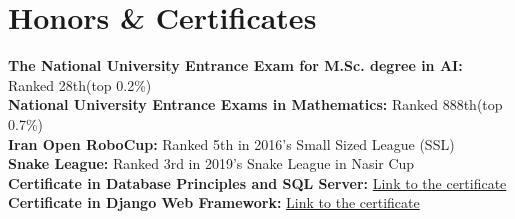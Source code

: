 
\section{Honors \& Certificates}
  \vspace{2pt}
  \resumeSubHeadingListStart
    \small{\item{
        \textbf{The National University Entrance Exam for M.Sc. degree in AI:} { Ranked 28th(top 0.2\%)}
        \\ \vspace{3pt}
        \textbf{National University Entrance Exams in Mathematics:} { Ranked 888th(top 0.7\%)}
        \\ \vspace{3pt}
        \textbf{Iran Open RoboCup:} { Ranked 5th in 2016's Small Sized League (SSL)}
        \\ \vspace{3pt}
        \textbf{Snake League:} { Ranked 3rd in 2019's Snake League in Nasir Cup}
        \\ \vspace{3pt}
        \textbf{Certificate in Database Principles and SQL Server:} \href{https://maktabkhooneh.org/certificates/MK-O1USZA/?print=True}{\color{blue} Link to the certificate}
        \\ \vspace{3pt}
        \textbf{Certificate in Django Web Framework:} \href{https://www.coursera.org/account/accomplishments/verify/ZZDP44XE9B4G}{\color{blue} Link to the certificate}
    }}
  \resumeSubHeadingListEnd